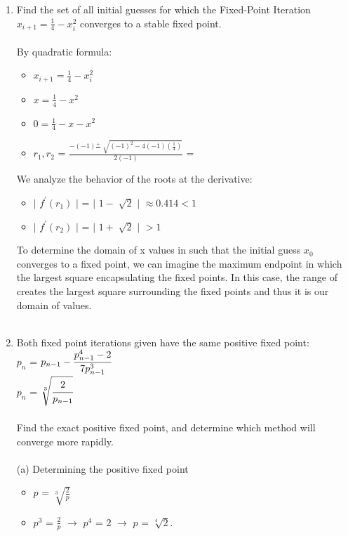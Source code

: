 \documentclass[12pt]{article}
\begin{document}
\begin{enumerate}
	\item Find the set of all initial guesses for which the Fixed-Point Iteration $x_{i+1} = \frac{1}{4} - x_{i}^2$ converges to a stable fixed point. \\ \\
	By quadratic formula:
	\begin{itemize}
		\item[] $x_{i+1} = \frac{1}{4} - x_{i}^2$
		\item[] $x = \frac{1}{4} - x^2$
		\item[] $0 = \frac{1}{4} - x - x^2$
		\item[] $r_1,r_2$ = $\frac{-(-1) \frac{+}{} \sqrt[]{(-1)^2 - 4(-1)(\frac{1}{4})}}{2(-1)}$ = 
	\end{itemize}
	We analyze the behavior of the roots at the derivative:
	\begin{itemize}
		\item[] $|$ $f^{'}(r_1)$ $|$ = $|$ $1 - \sqrt[]{2}$ $|$ $\approx 0.414 < 1$ 
		\item[] $|$ $f^{'}(r_2)$ $|$ = $|$ $1 + \sqrt[]{2}$ $|$ $> 1$ 
	\end{itemize}
	To determine the domain of x values in such that the initial guess $x_0$ converges to a fixed point, we can imagine the maximum endpoint in which the largest square encapsulating the fixed points. In this case, the range of  creates the largest square surrounding the fixed points and thus it is our domain of values. \\ \\
	\item Both fixed point iterations given have the same positive fixed point: \\
	$p_n$ = $p_{n-1} - \cfrac{p_{n-1}^4-2}{7p_{n-1}^3}$ \\
	$p_n$ = $\sqrt[3]{\cfrac{2}{p_{n-1}}}$ \\ \\
	Find the exact positive fixed point, and determine which method will converge more rapidly. \\ \\
	(a) Determining the positive fixed point
	\begin{itemize}
		\item[] $p$ = $\sqrt[3]{\frac{2}{p}}$
		\item[] $p^3$ = $\frac{2}{p}$ $\rightarrow$ $p^4$ = 2 $\rightarrow$ $p$ = $\sqrt[4]{2}$.
	\end{itemize}

\end{enumerate}
\end{document}
